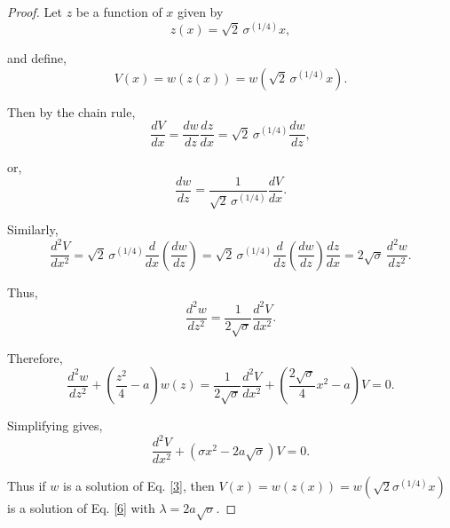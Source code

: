 \documentclass[10pt,a4paper]{amsart}
\begin{document}
\begin{proof}
Let $z$ be a function of $x$ given by
\begin{equation}
z(x)=\sqrt{2}\,\sigma^{(1/4)}x,\label{15}
\end{equation}

and define,
\begin{equation}
V(x)=w(z(x))=w(\sqrt{2}\,\sigma^{(1/4)}x).\label{16}
\end{equation}

Then by the chain rule,
\begin{equation}
\frac{dV}{dx}=\frac{dw}{dz}\frac{dz}{dx}=\sqrt{2}\,\sigma^{(1/4)}\frac{dw}{dz},\label{17}
\end{equation}

or,
\begin{equation}
\frac{dw}{dz}=\frac{1}{\sqrt{2}\,\sigma^{(1/4)}}\frac{dV}{dx}.\label{18}
\end{equation}

Similarly,
\begin{equation}
\frac{d^2V}{dx^2}=\sqrt{2}\,\sigma^{(1/4)}\frac{d}{dx}\left(\frac{dw}{dz}\right)=\sqrt{2}\,\sigma^{(1/4)}\frac{d}{dz}\left(\frac{dw}{dz}\right)\frac{dz}{dx}= 2\sqrt{\sigma}\,\frac{d^2w}{dz^2}.\label{19}
\end{equation}

Thus,
\begin{equation}
\frac{d^2w}{dz^2}=\frac{1}{2\sqrt{\sigma}}\frac{d^2V}{dx^2}.\label{20}
\end{equation}

Therefore,
\begin{equation}
\frac{d^2 w}{dz^2}+\left(\frac{z^2}{4}-a\right)w(z)=\frac{1}{2\sqrt{\sigma}}\frac{d^2V}{dx^2}+\left(\frac{2\sqrt{\sigma}}{4}x^2 -a\right)\!V=0.\label{21}
\end{equation}

Simplifying gives,
\begin{equation}
\frac{d^2 V}{dx^2}+ (\sigma x^2 - 2a\sqrt{\sigma})V=0.\label{22}
\end{equation}

Thus if $w$ is a solution of Eq. \eqref{3}, then $V(x)= w(z(x))=w(\sqrt{2}\sigma^{(1/4)}x)$ is a solution of Eq. \eqref{6} with $\lambda=2a\sqrt{\sigma}$.
\end{proof}
\end{document}
